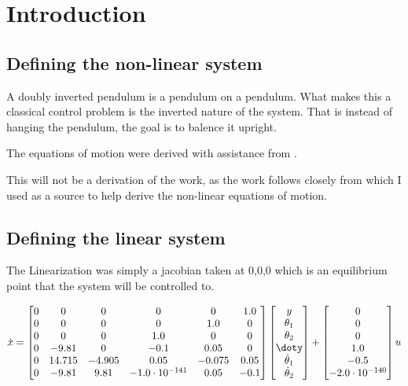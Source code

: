 \section{Introduction}

\subsection{Defining the non-linear system}
A doubly inverted pendulum is a pendulum on a pendulum. What makes this a classical control problem is the
inverted nature of the system. That is instead of hanging the pendulum, the goal is to balence it upright.

The equations of motion were derived with assistance from \cite{eq_of_motion}.

This will not be a derivation of the work, as the work follows closely from \cite{eq_of_motion} which I used
as a source to help derive the non-linear equations of motion. 


\subsection{Defining the linear system}
The Linearization was simply a jacobian taken at 0,0,0 which is an equilibrium point that the system will be
controlled to.

\begin{equation}
 \dot x = \left[\begin{matrix}0 & 0 & 0 & 0 & 0 & 1.0\\0 & 0 & 0 & 0 & 1.0 & 0\\0 & 0 & 0 & 1.0 & 0 & 0\\0 & -9.81 & 0 & -0.1 & 0.05 & 0\\0 & 14.715 & -4.905 & 0.05 & -0.075 & 0.05\\0 & -9.81 & 9.81 & -1.0 \cdot 10^{-141} & 0.05 & -0.1\end{matrix}\right]\left[\begin{matrix}y\\\theta_{1}\\\theta_{2}\\\doty\\\dot\theta_{1}\\\dot\theta_{2}\end{matrix}\right] + \left[\begin{matrix}0\\0\\0\\1.0\\-0.5\\-2.0 \cdot 10^{-140}\end{matrix}\right]u
\end{equation}



